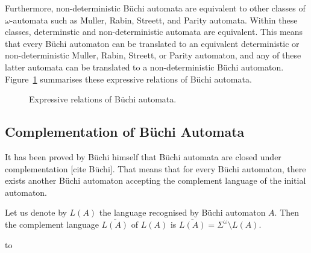 \documentclass{scrreprt}
\newcommand{\om}{{$\omega$}}
\begin{document}
Furthermore, non-deterministic Büchi automata are equivalent to other classes of \om-automata such as Muller, Rabin, Streett, and Parity automata. Within these classes, determinstic and non-deterministic automata are equivalent. This means that every Büchi automaton can be translated to an equivalent deterministic or non-deterministic Muller, Rabin, Streett, or Parity automaton, and any of these latter automata can be translated to a non-deterministic Büchi automaton. Figure~\ref{equivalences} summarises these expressive relations of Büchi automata.

\begin{figure}[htb]
\begin{center}
\caption{Expressive relations of Büchi automata.}
\label{equivalences}
\end{center}
\end{figure}

\subsection{Complementation of Büchi Automata}
It has been proved by Büchi himself that Büchi automata are closed under complementation [cite Büchi]. That means that for every Büchi automaton, there exists another Büchi automaton accepting the complement language of the initial automaton.

Let us denote by $L(A)$ the language recognised by Büchi automaton $A$. Then the complement language $\overline{L(A)}$ of $L(A)$ is $\overline{L(A)} = \Sigma^\omega \setminus L(A)$.

\hbox to 
\end{document}

